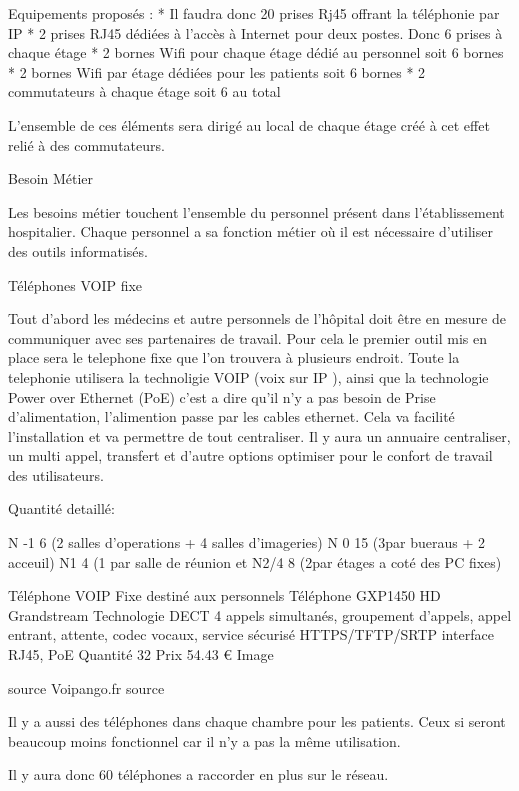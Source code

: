 Equipements proposés :
* Il faudra donc 20 prises Rj45 offrant la téléphonie par IP
* 2 prises RJ45 dédiées à l’accès à Internet pour deux postes. Donc 6 prises à chaque étage
* 2 bornes Wifi pour chaque étage dédié au personnel soit 6 bornes
* 2 bornes Wifi par étage dédiées pour les patients soit 6 bornes
* 2 commutateurs à chaque étage soit 6 au total


L’ensemble de ces éléments sera dirigé au local de chaque étage créé à cet effet relié à des commutateurs.


Besoin Métier




Les besoins métier touchent l’ensemble du personnel présent dans l’établissement hospitalier. Chaque personnel a sa fonction métier où il est nécessaire d’utiliser des outils informatisés.




Téléphones VOIP fixe


Tout d’abord les médecins et autre personnels de l'hôpital doit être en mesure de communiquer avec ses partenaires de travail. Pour cela le premier outil mis en place sera le telephone fixe que l’on trouvera à plusieurs endroit. Toute la telephonie utilisera la technoligie VOIP (voix sur IP ), ainsi que la technologie Power over Ethernet (PoE) c’est a dire qu’il n’y a pas besoin de Prise d’alimentation, l’alimention passe par les cables ethernet. Cela va facilité l’installation et va permettre de tout centraliser. Il y aura un annuaire centraliser, un multi appel, transfert et d’autre options optimiser pour le confort de travail des utilisateurs.


Quantité detaillé:


N -1 6 (2 salles d’operations + 4 salles d’imageries)
N 0 15 (3par bueraus + 2 acceuil)
N1 4 (1 par salle de réunion et
N2/4 8 (2par étages a coté des PC fixes)

Téléphone VOIP Fixe destiné aux personnels
    Téléphone
    GXP1450 HD Grandstream
    Technologie
    DECT 4 appels simultanés, groupement d’appels, appel entrant, attente, codec vocaux, service sécurisé HTTPS/TFTP/SRTP
interface RJ45, PoE
    Quantité
    32
    Prix
    54.43 €
    Image


    source
    Voipango.fr source


Il y a aussi des téléphones dans chaque chambre pour les patients. Ceux si seront beaucoup moins fonctionnel car il n’y a pas la même utilisation.


Il y aura donc 60 téléphones a raccorder en plus sur le réseau.




